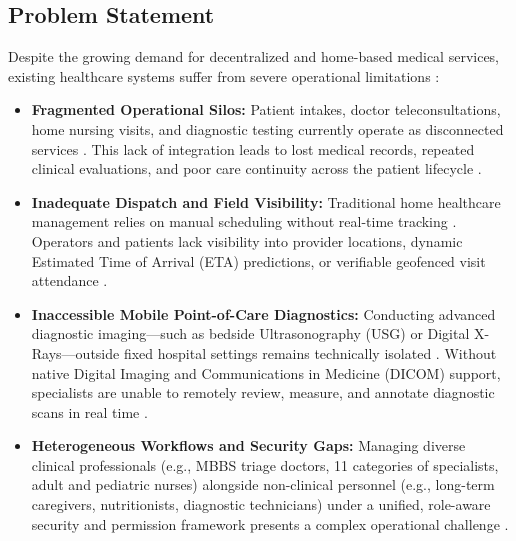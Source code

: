 \documentclass[lettersize,onecolumn,journal]{IEEEtran}
\begin{document}
	\subsection{Problem Statement}
	Despite the growing demand for decentralized and home-based medical services, existing healthcare systems suffer from severe operational limitations \cite{telemedicine_homecare}:
	\begin{itemize}
		\item \textbf{Fragmented Operational Silos:} Patient intakes, doctor teleconsultations, home nursing visits, and diagnostic testing currently operate as disconnected services \cite{srs2026}. This lack of integration leads to lost medical records, repeated clinical evaluations, and poor care continuity across the patient lifecycle \cite{srs2026}.
		\item \textbf{Inadequate Dispatch and Field Visibility:} Traditional home healthcare management relies on manual scheduling without real-time tracking \cite{zandbergen2009accuracy}. Operators and patients lack visibility into provider locations, dynamic Estimated Time of Arrival (ETA) predictions, or verifiable geofenced visit attendance \cite{zandbergen2009accuracy, osrm_routing}.
		\item \textbf{Inaccessible Mobile Point-of-Care Diagnostics:} Conducting advanced diagnostic imaging—such as bedside Ultrasonography (USG) or Digital X-Rays—outside fixed hospital settings remains technically isolated \cite{pacs2001}. Without native Digital Imaging and Communications in Medicine (DICOM) support, specialists are unable to remotely review, measure, and annotate diagnostic scans in real time \cite{dicom2021, cornerstone3d}.
		\item \textbf{Heterogeneous Workflows and Security Gaps:} Managing diverse clinical professionals (e.g., MBBS triage doctors, 11 categories of specialists, adult and pediatric nurses) alongside non-clinical personnel (e.g., long-term caregivers, nutritionists, diagnostic technicians) under a unified, role-aware security and permission framework presents a complex operational challenge \cite{rbac_standard}.
	\end{itemize}
	
\end{document}
